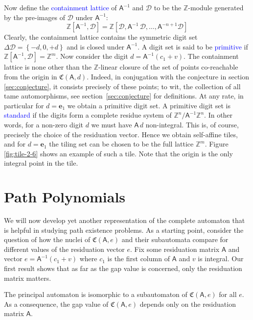 \documentclass[12pt]{svmult}
\def\emph#1{\textcolor{blue}{#1}}
\def\DD{\mathcal{D}}            %
\def\setof#1{\left\{ {#1} \right\}}
\def\Z{\mathbb{Z}}
\def\AA{\mathsf{A}}             %
\def\Ai{\mathsf{A}^{-1}}        %
\def\ZM#1{\Z[{#1}]}               %
\def\cmpaut{\fC}                %
\def\fC{\mathfrak{C}}           %
\def\unvo{\mathbf{e}_{1}}
\begin{document}
Now define the \emph{containment lattice} of $\Ai$ and $\DD$ to be the $\Z$-module generated by 
the pre-images of $\DD$ under $\Ai$:
%
\begin{equation}
  \label{eq:containment}
  \ZM{\Ai,\DD} = \ZM{\DD,\Ai\,\DD,\ldots,\AA^{-n+1}\DD}
\end{equation}
%
Clearly, the containment lattice contains the symmetric digit set 
$\Delta \DD = \setof{-d,0,+d}$ and is closed under $\Ai$.
A digit set is said to be \emph{primitive} if $\ZM{\Ai,\DD} = \Z^{m}$.
Now consider the digit $d = \Ai(c_{1} + v)$. 
The containment lattice is none other than the $\Z$-linear closure of the set of points 
co-reachable from the origin in $\cmpaut(\AA,d)$. 
Indeed, in conjugation with the conjecture in section \ref{sec:conjecture}, it consists 
precisely of these points; to wit, the collection of all tame automorphisms, 
see section~\ref{sec:conjecture} for definitions.  
At any rate, in particular for $d = \unvo$ we obtain a primitive digit set. 
A primitive digit set is \emph{standard} if the digits form a complete residue system of 
$\Z^{n}/\Ai \Z^{n}$. 
In other words, for a non-zero digit $d$ we must have $\AA \, d$ non-integral. 
This is, of course, precisely the choice of the residuation vector. 
Hence we obtain self-affine tiles, and for $d = \unvo$ the tiling set can be chosen to be the 
full lattice $\Z^{m}$. 
Figure \ref{fig:tile-2-6} shows an example of such a tile. 
Note that the origin is the only integral point in the tile. 


\section{Path Polynomials}
\label{sec:path-polys}

We will now develop yet another representation of the complete automaton that is 
helpful in studying path existence problems. 
As a starting point, consider 
the question of how the nuclei of $\cmpaut(\AA,e)$ and their subautomata compare for different
values of the residuation vector $e$. 
Fix some residuation matrix $\AA$ and vector $e = \Ai(c_{1} + v)$ where 
$c_{1}$ is the first column of $\AA$ and $v$ is integral. 
Our first result shows that as far as the gap value is concerned, only the residuation
matrix matters. 


\begin{theorem}
\label{thm:gap-value}
The principal automaton is isomorphic to a subautomaton of $\cmpaut(\AA,e)$
for all $e$. 
As a consequence, the gap value of $\cmpaut(\AA,e)$ depends 
only on the residuation matrix $\AA$. 
\end{theorem}
\end{document}
